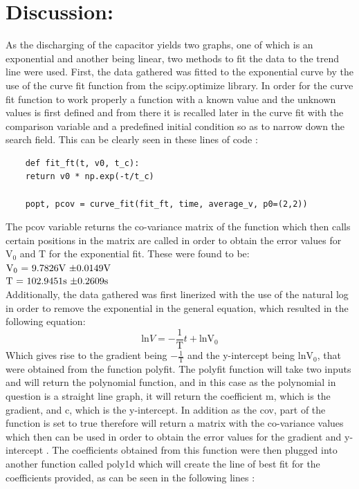 \documentclass[12pt, a4paper]{article}
\begin{document}
\section*{Discussion:}
As the discharging of the capacitor yields two graphs, one of which is an exponential and another being linear, two methods to fit the data to the trend line were used. First, the data gathered was fitted to the exponential curve by the use of the curve fit function from the scipy.optimize library. In order for the curve fit function to work properly a function with a known value and the unknown values is first defined and from there it is recalled later in the curve fit with the comparison variable and a predefined initial condition so as to narrow down the search field. This can be clearly seen in these lines of code \parencite{Scipy.org_CurveFit}:
\begin{verbatim}
    def fit_ft(t, v0, t_c):
    return v0 * np.exp(-t/t_c)

    popt, pcov = curve_fit(fit_ft, time, average_v, p0=(2,2))
\end{verbatim}
The pcov variable returns the co-variance matrix of the function which then calls certain positions in the matrix are called in order to obtain the error values for $\text{V}_0$ and T for the exponential fit. These were found to be:\\
\indent$\text{V}_0 \text{ = 9.7826V \textpm 0.0149V} $\\
\indent$\text{T} \text{ = 102.9451s \textpm 0.2609s}$\\
Additionally, the data gathered was first linerized with the use of the natural log in order to remove the exponential in the general equation, which resulted in the following equation:
\begin{equation}
    \mbox{ln}V = -\frac{1}{\mbox{T}}t + \mbox{lnV}_0
    \end{equation}
Which gives rise to the gradient being $-\frac{1}{\mbox{T}}$ and the y-intercept being $\mbox{lnV}_0$, that were obtained from the function polyfit. The polyfit function will take two inputs and will return the polynomial function, and in this case as the polynomial in question is a straight line graph, it will return the coefficient m, which is the gradient, and c, which is the y-intercept. In addition as the cov, part of the function is set to true therefore will return a matrix with the co-variance values which then can be used in order to obtain the error values for the gradient and y-intercept \parencite{Numpy.Polyfit}. The coefficients obtained from this function were then plugged into another function called poly1d which will create the line of best fit for the coefficients provided, as can be seen in the following lines \parencite{Numpy.Poly1D}:
\end{document}
